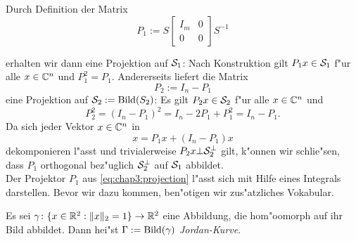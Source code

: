 \newpage
Durch Definition der Matrix
\begin{equation}\label{eq:chap3:projection}
P_1 := S \begin{bmatrix} I_m & 0 \\ 0 & 0 \end{bmatrix}S^{-1}
\end{equation}

erhalten wir dann eine Projektion auf $\S_1$: Nach Konstruktion gilt $P_1 x \in \S_1$ f"ur alle $x\in\Cn$
und $P_1^2 = P_1$. Andererseits liefert die Matrix
\[
P_2 := I_n - P_1
\]
eine Projektion auf $\S_2 := \Bild(S_2)$: Es gilt $P_2 x\in\S_2$ f"ur alle $x\in\Cn$ und
\[
P_2^2 = (I_n - P_1)^2 = I_n - 2P_1 + P_1^2 = I_n - P_1.
\]
Da sich jeder Vektor $x\in\Cn$ in
\[
x = P_1 x + (I_n - P_1)x
\]
dekomponieren l"asst und trivialerweise $P_2 x \bot \S_2^\bot$ gilt, k"onnen wir schlie"sen, dass $P_1$ orthogonal bez"uglich $\S_2^\bot$ auf $\S_1$ abbildet.\\

Der Projektor $P_1$ aus \eqref{eq:chap3:projection} l"asst sich mit Hilfe eines Integrals darstellen. Bevor wir dazu kommen, ben"otigen wir zus"atzliches Vokabular.

\begin{defn}\label{defn:chap3:jordanKurve}
Es sei $\gamma\colon\{x\in\R^2 : \|x\|_2 = 1\}\to\R^2$ eine Abbildung, die hom"oomorph auf ihr Bild abbildet.
Dann hei"st $\Gamma := \Bild(\gamma)$ \emph{Jordan-Kurve}.
\end{defn}

